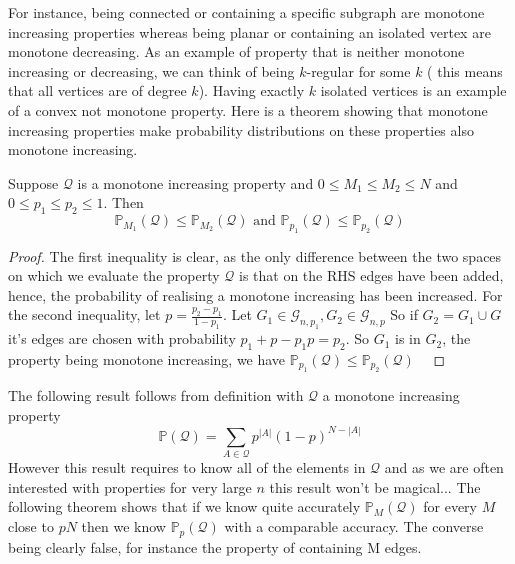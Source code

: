 For instance, being connected or containing a specific subgraph are monotone increasing properties whereas being planar or containing an isolated vertex are monotone decreasing. 
As an example of property that is neither monotone increasing or decreasing, we can think of being $k$-regular for some $k$ ( this means that all vertices are of degree $k$).
Having exactly $k$ isolated vertices is an example of a convex not monotone property.
\newline
Here is a theorem showing that monotone increasing properties make probability distributions on these properties also monotone increasing.
\begin{theorem}\label{th:QIncr}
	Suppose $\mathcal{Q}$ is a monotone increasing property and $0 \leq M_1 \leq M_2 \leq N$ and $0 \leq p_1 \leq p_2 \leq 1$.
	\newline
	Then
	$$\mathbb{P}_{M_1}(\mathcal{Q}) \leq  \mathbb{P}_{M_2}(\mathcal{Q}) \text{  and  } \mathbb{P}_{p_1}(\mathcal{Q}) \leq \mathbb{P}_{p_2}(\mathcal{Q})$$
\end{theorem}
\begin{proof}
	The first inequality is clear, as the only difference between the two spaces on which we evaluate the property $\mathcal{Q}$ is that on the RHS edges have been added, hence, the probability of realising a monotone increasing has been increased.
	\newline
	For the second inequality, let $p = \frac{p_2 - p_1}{1 - p_1}$. Let $G_1 \in \mathcal{G}_{n, p_1}, G_2 \in \mathcal{G}_{n, p}$
	\newline
	So if $G_2 = G_1 \cup G$ it's edges are chosen with probability $p_1 + p - p_1 p = p_2$. So $G_1$ is in $G_2$, the property being monotone increasing, we have $ \mathbb{P}_{p_1}(\mathcal{Q}) \leq \mathbb{P}_{p_2}(\mathcal{Q})$
\
\end{proof}
The following result follows from definition with $\mathcal{Q}$ a monotone increasing property
\begin{equation}\label{eq:QProp}
	\mathbb{P}(\mathcal{Q}) = \sum_{A \in \mathcal{Q}} p^{|A|}(1-p)^{N-|A|}
\end{equation}
However this result requires to know all of the elements in $\mathcal{Q}$ and as we are often interested with properties for very large $n$ this result won't be magical... 
\newline
The following theorem shows that if we know quite accurately $\mathbb{P}_M(\mathcal{Q})$ for every $M$ close to $pN$ then we know $\mathbb{P}_p(\mathcal{Q})$ with a comparable accuracy. The converse being clearly false, for instance the property of containing M edges.

